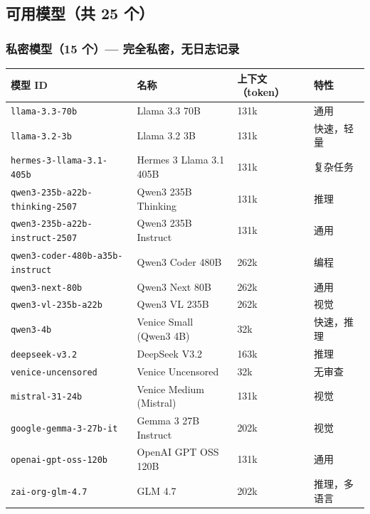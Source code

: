 \subsection{可用模型（共 25 个）}


\subsubsection{私密模型（15 个）— 完全私密，无日志记录}



\begin{table}[h]
\centering
\small
\begin{tabular}{|l|l|l|l|}
\hline
模型 ID & 名称 & 上下文（token） & 特性 \\
\hline
\texttt{llama-3.3-70b} & Llama 3.3 70B & 131k & 通用 \\
\hline
\texttt{llama-3.2-3b} & Llama 3.2 3B & 131k & 快速，轻量 \\
\hline
\texttt{hermes-3-llama-3.1-405b} & Hermes 3 Llama 3.1 405B & 131k & 复杂任务 \\
\hline
\texttt{qwen3-235b-a22b-thinking-2507} & Qwen3 235B Thinking & 131k & 推理 \\
\hline
\texttt{qwen3-235b-a22b-instruct-2507} & Qwen3 235B Instruct & 131k & 通用 \\
\hline
\texttt{qwen3-coder-480b-a35b-instruct} & Qwen3 Coder 480B & 262k & 编程 \\
\hline
\texttt{qwen3-next-80b} & Qwen3 Next 80B & 262k & 通用 \\
\hline
\texttt{qwen3-vl-235b-a22b} & Qwen3 VL 235B & 262k & 视觉 \\
\hline
\texttt{qwen3-4b} & Venice Small (Qwen3 4B) & 32k & 快速，推理 \\
\hline
\texttt{deepseek-v3.2} & DeepSeek V3.2 & 163k & 推理 \\
\hline
\texttt{venice-uncensored} & Venice Uncensored & 32k & 无审查 \\
\hline
\texttt{mistral-31-24b} & Venice Medium (Mistral) & 131k & 视觉 \\
\hline
\texttt{google-gemma-3-27b-it} & Gemma 3 27B Instruct & 202k & 视觉 \\
\hline
\texttt{openai-gpt-oss-120b} & OpenAI GPT OSS 120B & 131k & 通用 \\
\hline
\texttt{zai-org-glm-4.7} & GLM 4.7 & 202k & 推理，多语言 \\
\hline
\end{tabular}
\end{table}



